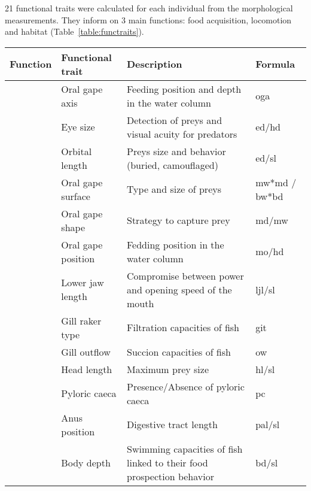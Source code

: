 21 functional traits were calculated for each individual from the morphological measurements. They inform on 3 main functions: food acquisition, locomotion and habitat (Table~\ref{table:functraits}).

\begin{sidewaystable}
\centering
\caption[Functional traits descriptions and formulas]{Description and formulas of the functionals traits computed from morphological measurements, following \citep{albouy2011, aneeshkumar2017,boyle2006,brindamour2016,diderich2006,dumay2004,habib2019,ibanez2007,sibbing2000,webb1984,winemiller1991}. Abbreviations used in formulas are provided by raw measurements and detailed in appendices \ref{fig:full_body}, \ref{fig:head} \& \ref{fig:fin}. \texttt{oga}, \texttt{git}, \texttt{pc}, \texttt{pht} are categorial variables directly provided by raw measurements with the first two scores detailed respectively in appendices \ref{fig:git} \& \ref{fig:oga}.}
\label{table:functraits}
\begin{tabular}{>{\bfseries}lll>{\ttfamily}l}
\toprule
Function & Functional trait & Description & Formula  \\ 
\midrule
\multirow{13}{*}{Feeding} &Oral gape axis & Feeding position and depth in the water column & oga \\ 
  &Eye size & Detection of preys and visual acuity for predators & ed/hd \\ 
  &Orbital length & Preys size and behavior (buried, camouflaged) & ed/sl \\ 
  &Oral gape surface & Type and size of preys & mw*md / bw*bd \\ 
  &Oral gape shape & Strategy to capture prey & md/mw \\ 
  &Oral gape position & Fedding position in the water column & mo/hd \\ 
  &Lower jaw length & Compromise between power and opening speed of the mouth & ljl/sl \\ 
  &Gill raker type & Filtration capacities of fish & git \\ 
  &Gill outflow & Succion capacities of fish & ow \\ 
  &Head length & Maximum prey size & hl/sl \\ 
  &Pyloric caeca & Presence/Absence of pyloric caeca & pc \\ 
  &Anus position & Digestive tract length & pal/sl \\ 
\midrule
  \multirow{6}{*}{Locomotion} & Body depth & Swimming capacities of fish linked to their food prospection behavior & bd/sl \\ 

\end{tabular}
\end{sidewaystable}
